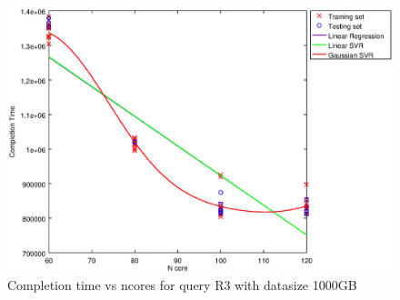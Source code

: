 
\begin {figure}[hbtp]
\centering
\includegraphics[width=\textwidth]{output/R3_1000_ONLY_1_LINEAR_NCORE/plot_R3_1000_bestmodels.eps}
\caption{Completion time vs ncores for query R3 with datasize 1000GB}
\label{fig:only_1_linear_R3_1000}
\end {figure}
